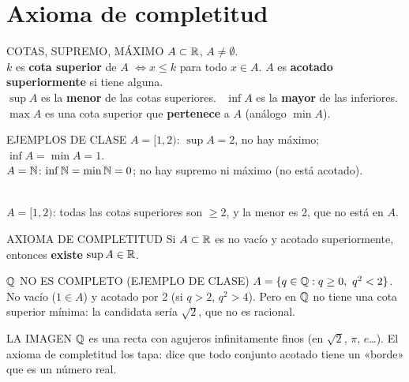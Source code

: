 \section{Axioma de completitud}
\apuntes
\begin{sello}{COTAS, SUPREMO, MÁXIMO}
$A\subset\mathbb{R}$, $A\neq\emptyset$.\\[2pt]
$k$ es \textbf{cota superior} de $A$ $\iff x\le k$ para todo $x\in A$. $A$ es \textbf{acotado superiormente} si tiene alguna.\\[2pt]
$\sup A$ es la \textbf{menor} de las cotas superiores. \ $\inf A$ es la \textbf{mayor} de las inferiores.\\[2pt]
$\max A$ es una cota superior que \textbf{pertenece} a $A$ (análogo $\min A$).
\end{sello}
\begin{memo}{EJEMPLOS DE CLASE}
$A=[1,2)$: $\sup A=2$, no hay máximo; $\inf A=\min A=1$.\\
$A=\mathbb{N}$: $\inf\mathbb{N}=\min\mathbb{N}=0$; no hay supremo ni máximo (no está acotado).
\end{memo}
\begin{center}
\\
{\ttfamily\scriptsize\color{suave} $A=[1,2)$: todas las cotas superiores son $\ge2$, y la menor es 2, que no está en $A$.}
\end{center}
\apuntes
\begin{sello}{AXIOMA DE COMPLETITUD}
Si $A\subset\mathbb{R}$ es no vacío y acotado superiormente, entonces \textbf{existe} $\sup A\in\mathbb{R}$.
\end{sello}
\begin{memo}{$\mathbb{Q}$ NO ES COMPLETO (EJEMPLO DE CLASE)}
$A=\{q\in\Q: q\ge0,\ q^2<2\}$. No vacío ($1\in A$) y acotado por 2 (si $q>2$, $q^2>4$). Pero en $\mathbb{Q}$ no tiene una cota superior mínima: la candidata sería $\sqrt2$, que no es racional.
\end{memo}
\begin{tip}{LA IMAGEN}
$\mathbb{Q}$ es una recta con agujeros infinitamente finos (en $\sqrt2$, $\pi$, $e$\dots). El axioma de completitud los tapa: dice que todo conjunto acotado tiene un «borde» que es un número real.
\end{tip}

